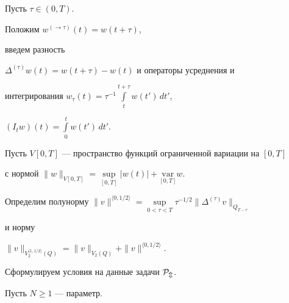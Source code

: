 Пусть $\tau\in (0,T)$.


Положим $w^{(\to\tau)}(t)=w(t+\tau)$,


введем разность


$\varDelta^{(\tau)}w(t)=w(t+\tau)-w(t)$ и операторы усреднения и


интегрирования $w_{\tau}(t) =


\tau^{-1}\int\limits_t^{t+\tau} w(t')\,dt'$,


$(I_tw)(t)=\int\limits_0^tw(t')\,dt'.$


Пусть $V[0,T]$ --- пространство функций ограниченной вариации на $[0,T]$


с нормой $\|w\|_{V[0,T]}=\underset{[0,T]}{\sup}{}|w(t)| +


\underset{[0,T]}{\text{var}}{}w$.


Определим полунорму $\|v\|^{\langle 0,1/2\rangle}=


\underset{0<\tau<T}


{\sup}\tau^{-1/2}\|\varDelta^{(\tau)}v\|_{Q_{T-\tau}}$


и норму


$\|v\|_{V^{\langle1,1/2\rangle}_2(Q)}=\|v\|_{V_2(Q)}+


\|v\|^{\langle0,1/2\rangle}.$





Сформулируем условия на данные задачи $\cal P_m$.


Пусть $N\ge 1$ --- параметр.


